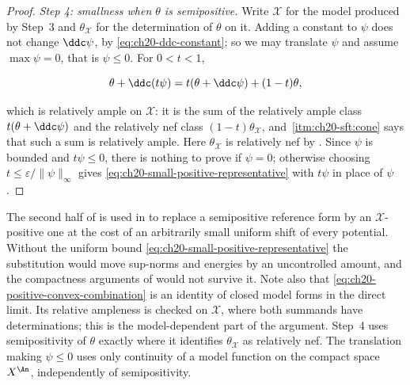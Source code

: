 \begin{proof}
\emph{Step 4: smallness when $\theta$ is semipositive.}  Write
$\mathcal X$ for the model produced by Step~3 and $\theta_{\mathcal X}$
for the determination of $\theta$ on it.  Adding a constant
to $\psi$ does not change $\ddc\psi$, by
\eqref{eq:ch20-ddc-constant}; so we may translate $\psi$ and assume
$\max\psi=0$, that is $\psi\leq0$.  For $0<t<1$,

\begin{equation}
\label{eq:ch20-positive-convex-combination}
 \theta+\ddc(t\psi)
 =t(\theta+\ddc\psi)+(1-t)\theta ,
\end{equation}

which is relatively ample on $\mathcal X$: it is the sum of the relatively
ample class $t(\theta+\ddc\psi)$ and the relatively nef class
$(1-t)\theta_{\mathcal X}$, and
\,\cref{itm:ch20-sft:cone} says that such a
sum is relatively ample.  Here $\theta_{\mathcal X}$ is relatively nef by
.
Since $\psi$ is bounded and $t\psi\leq0$, there is nothing to prove if
$\psi=0$; otherwise choosing
$t\leq\varepsilon/\|\psi\|_\infty$ gives
\eqref{eq:ch20-small-positive-representative} with $t\psi$ in place of
$\psi$.
\end{proof}

\begin{remark}
\label{rem:ch20-smallness}
The second half of  is used in
 to replace a semipositive reference
form by an $\mathcal X$-positive one at the cost of an arbitrarily small
uniform shift of every potential.  Without the uniform bound
\eqref{eq:ch20-small-positive-representative} the substitution would move
sup-norms and energies by an uncontrolled amount, and the compactness
arguments of  would not survive it.  Note also
that \eqref{eq:ch20-positive-convex-combination} is an identity of closed
model forms in the direct limit.  Its relative ampleness is checked on
$\mathcal X$, where both summands have determinations; this is the
model-dependent part of the argument.  Step~4 uses semipositivity of $\theta$ exactly where it identifies
$\theta_{\mathcal X}$ as relatively nef.  The translation making
$\psi\leq0$ uses only continuity of a model function on the compact
space $X^{\An}$, independently of semipositivity.
\end{remark}

